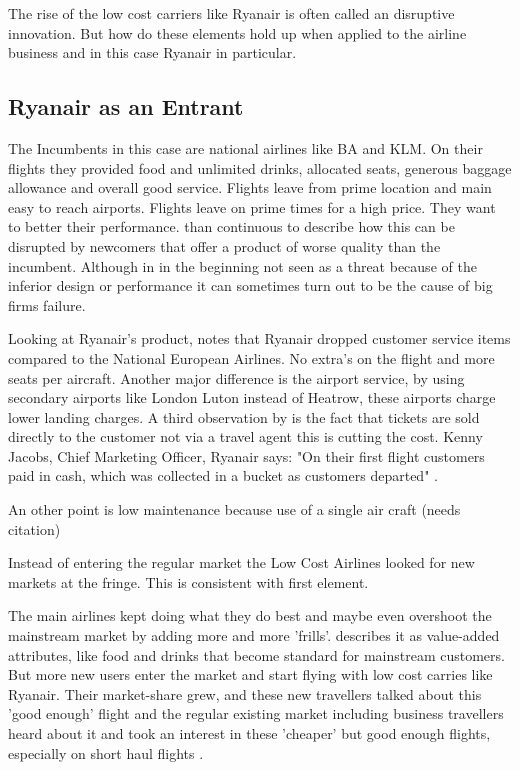 \documentclass[a4paper, 11pt]{article}
\begin{document}
The rise of the low cost carriers like Ryanair is often called an disruptive innovation.
But how do these elements hold up when applied to the airline business and in this case Ryanair in particular.


\subsection{Ryanair as an Entrant}


The Incumbents in this case are national airlines like BA and KLM. On their flights they provided food and unlimited drinks, allocated seats, generous baggage allowance and overall good service. Flights leave from prime location and main easy to reach airports. Flights leave on prime times for a high price. They want to better their performance. \cite{Christensen97} than continuous to describe how this can be disrupted by newcomers that offer a product of worse quality than the incumbent. Although in in the beginning not seen as a threat because of the inferior design or performance it can sometimes turn out to be the cause of big firms failure.

Looking at Ryanair's product, \cite{Barrett} notes that Ryanair dropped customer service items compared to the National European Airlines. No extra's on the flight and more seats per aircraft. Another major difference is the airport service, by using secondary airports like London Luton instead of Heatrow, these airports charge lower landing charges. A third observation by \cite{Barrett} is the fact that tickets are sold directly to the customer not via a travel agent this is cutting the cost. Kenny Jacobs, Chief Marketing Officer, Ryanair says: "On their first flight customers paid in cash, which was collected in a bucket as customers departed" \citep{ITBberlin}.

An other point is low maintenance because use of a single air craft (needs citation)

Instead of entering the regular market the Low Cost Airlines looked for new markets at the fringe. This is consistent with
\cite{Christensen2015} first element.


The main airlines kept doing what they do best and maybe even overshoot the mainstream market by adding more and more 'frills'. \cite{Droege} describes it as value-added attributes, like food and drinks that become standard for mainstream customers. But more new users enter the market and start flying with low cost carries like Ryanair. Their market-share grew, and these new travellers talked about this 'good enough' flight and the regular existing market including business travellers heard about it and took an interest in these 'cheaper' but good enough flights, especially on short haul flights \citep{TiddBessant}.
\end{document}
